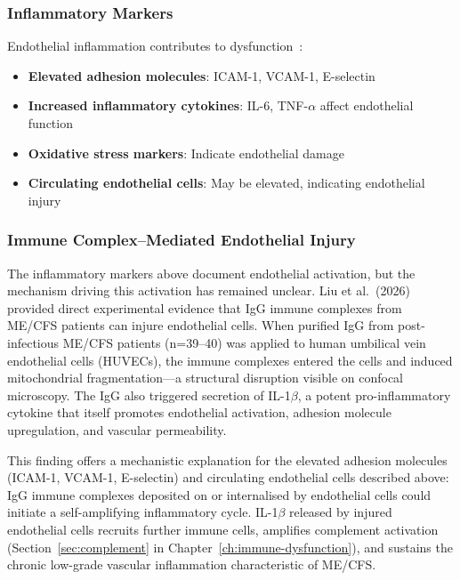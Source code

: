 \subsubsection{Inflammatory Markers}

Endothelial inflammation contributes to dysfunction~\cite{Appel2025}:

\begin{itemize}
    \item \textbf{Elevated adhesion molecules}: ICAM-1, VCAM-1, E-selectin~\cite{Appel2025}
    \item \textbf{Increased inflammatory cytokines}: IL-6, TNF-$\alpha$ affect endothelial function
    \item \textbf{Oxidative stress markers}: Indicate endothelial damage
    \item \textbf{Circulating endothelial cells}: May be elevated, indicating endothelial injury
\end{itemize}

\subsubsection{Immune Complex--Mediated Endothelial Injury}
\label{sec:igg-endothelial}

The inflammatory markers above document endothelial activation, but the mechanism driving this activation has remained unclear. Liu et al.\ (2026)~\cite{Liu2026IgGcomplexes} provided direct experimental evidence that IgG immune complexes from ME/CFS patients can injure endothelial cells. When purified IgG from post-infectious ME/CFS patients (n=39--40) was applied to human umbilical vein endothelial cells (HUVECs), the immune complexes entered the cells and induced mitochondrial fragmentation---a structural disruption visible on confocal microscopy. The IgG also triggered secretion of IL-1$\beta$, a potent pro-inflammatory cytokine that itself promotes endothelial activation, adhesion molecule upregulation, and vascular permeability.

This finding offers a mechanistic explanation for the elevated adhesion molecules (ICAM-1, VCAM-1, E-selectin) and circulating endothelial cells described above: IgG immune complexes deposited on or internalised by endothelial cells could initiate a self-amplifying inflammatory cycle. IL-1$\beta$ released by injured endothelial cells recruits further immune cells, amplifies complement activation (Section~\ref{sec:complement} in Chapter~\ref{ch:immune-dysfunction}), and sustains the chronic low-grade vascular inflammation characteristic of ME/CFS.

